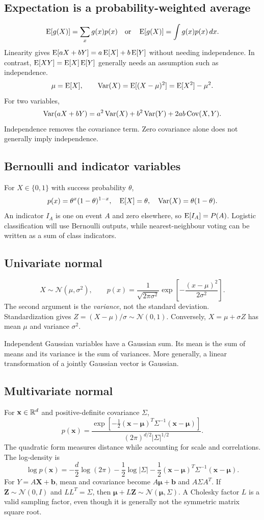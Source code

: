 \documentclass[11pt]{article}
\begin{document}
\subsection{Expectation is a probability-weighted average}
\[
\operatorname{E}[g(X)]=\sum_xg(x)p(x)\quad\hbox{or}\quad
\operatorname{E}[g(X)]=\int g(x)p(x)\,dx.
\]
Linearity gives $\operatorname{E}[aX+bY]=a\operatorname{E}[X]+b\operatorname{E}[Y]$ without needing independence. In contrast, $\operatorname{E}[XY]=\operatorname{E}[X]\operatorname{E}[Y]$ generally needs an assumption such as independence.
\[
\mu=\operatorname{E}[X],\qquad \operatorname{Var}(X)=\operatorname{E}[(X-\mu)^2]=\operatorname{E}[X^2]-\mu^2.
\]
For two variables,
\[
\operatorname{Var}(aX+bY)=a^2\operatorname{Var}(X)+b^2\operatorname{Var}(Y)+2ab\operatorname{Cov}(X,Y).
\]
Independence removes the covariance term. Zero covariance alone does not generally imply independence.
\subsection{Bernoulli and indicator variables}
For $X\in\{0,1\}$ with success probability $\theta$,
\[
p(x)=\theta^x(1-\theta)^{1-x},\quad
\operatorname{E}[X]=\theta,\quad\operatorname{Var}(X)=\theta(1-\theta).
\]
An indicator $I_A$ is one on event $A$ and zero elsewhere, so $\operatorname{E}[I_A]=P(A)$. Logistic classification will use Bernoulli outputs, while nearest-neighbour voting can be written as a sum of class indicators.
\subsection{Univariate normal}
\[
X\sim\mathcal N(\mu,\sigma^2),\qquad
p(x)=\frac{1}{\sqrt{2\pi\sigma^2}}
\exp\!\left[-\frac{(x-\mu)^2}{2\sigma^2}\right].
\]
The second argument is the \emph{variance}, not the standard deviation. Standardization gives $Z=(X-\mu)/\sigma\sim\mathcal N(0,1)$. Conversely, $X=\mu+\sigma Z$ has mean $\mu$ and variance $\sigma^2$.

Independent Gaussian variables have a Gaussian sum. Its mean is the sum of means and its variance is the sum of variances. More generally, a linear transformation of a jointly Gaussian vector is Gaussian.
\subsection{Multivariate normal}
For $\mathbf x\in\mathbb{R}^d$ and positive-definite covariance $\Sigma$,
\[
p(\mathbf x)=\frac{\exp[-\tfrac12(\mathbf x-\bm\mu)^T\Sigma^{-1}(\mathbf x-\bm\mu)]}
{(2\pi)^{d/2}|\Sigma|^{1/2}}.
\]
The quadratic form measures distance while accounting for scale and correlations. The log-density is
\[
\log p(\mathbf x)=-\frac d2\log(2\pi)-\frac12\log|\Sigma|
-\frac12(\mathbf x-\bm\mu)^T\Sigma^{-1}(\mathbf x-\bm\mu).
\]
For $Y=A\mathbf X+\mathbf b$, mean and covariance become $A\bm\mu+\mathbf b$ and $A\Sigma A^T$. If $\mathbf Z\sim\mathcal N(0,I)$ and $LL^T=\Sigma$, then $\bm\mu+L\mathbf Z\sim\mathcal N(\bm\mu,\Sigma)$. A Cholesky factor $L$ is a valid sampling factor, even though it is generally not the symmetric matrix square root.
\end{document}
